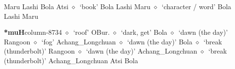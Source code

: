          Maru 
\hspace{1ex}
         Lashi 
\hspace{1ex}
         Bola 
\hspace{1ex}
         Atsi 
\hspace{1ex}
         $\diamond$~`book'
         Bola 
\hspace{1ex}
         Lashi 
\hspace{1ex}
         Maru 
\hspace{1ex}
         $\diamond$~`character / word'
         Bola 
\hspace{1ex}
         Lashi 
\hspace{1ex}
         Maru 
  \item {\footnotesize \textbf{*muH}}{\tiny column-8734}
         $\diamond$~`roof'
         OBur. 
\hspace{1ex}
         $\diamond$~`dark, get'
         Bola 
\hspace{1ex}
         $\diamond$~`dawn (the day)'
         Rangoon 
\hspace{1ex}
         $\diamond$~`fog'
         Achang\_Longchuan 
\hspace{1ex}
         $\diamond$~`dawn (the day)'
         Bola 
\hspace{1ex}
         $\diamond$~`break (thunderbolt)'
         Rangoon 
\hspace{1ex}
         $\diamond$~`dawn (the day)'
         Achang\_Longchuan 
\hspace{1ex}
         $\diamond$~`break (thunderbolt)'
         Achang\_Longchuan 
\hspace{1ex}
         Atsi 
\hspace{1ex}
         Bola 
\hspace{1ex}
